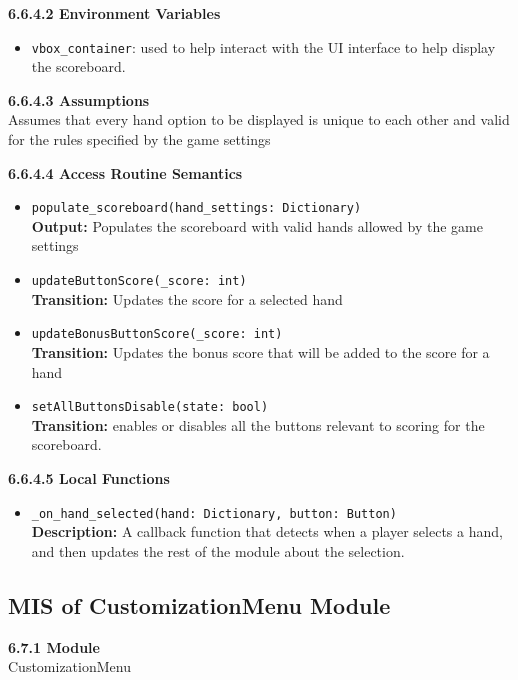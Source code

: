 \documentclass[12pt, titlepage]{article}
\begin{document}
\textbf{6.6.4.2 Environment Variables}

\begin{itemize}
	\item \texttt{vbox\_container}: used to help interact with the UI interface to help display the scoreboard. 
\end{itemize}

\textbf{6.6.4.3 Assumptions}\\
Assumes that every hand option to be displayed is unique to each other and valid for the rules specified by the game settings

\textbf{6.6.4.4 Access Routine Semantics}
\begin{itemize}

	\item \texttt{populate\_scoreboard(hand\_settings: Dictionary)}\\
	\textbf{Output:} Populates the scoreboard with valid hands allowed by the game settings
	
	
	\item \texttt{updateButtonScore(\_score: int)}\\
	\textbf{Transition:} Updates the score for a selected hand
	
	
	\item \texttt{updateBonusButtonScore(\_score: int)}\\
	\textbf{Transition:} Updates the bonus score that will be added to the score for a hand
	
	
	\item \texttt{setAllButtonsDisable(state: bool)}\\
	\textbf{Transition:} enables or disables all the buttons relevant to scoring for the scoreboard.
	
	


\end{itemize}

\textbf{6.6.4.5 Local Functions}

\begin{itemize}
    \item \texttt{\_on\_hand\_selected(hand: Dictionary, button: Button)}\\
    \textbf{Description:} A callback function that detects when a player selects a hand, and then updates the rest of the module about the selection.

\end{itemize}


\subsection{MIS of CustomizationMenu Module}\label{CustomizationMenu}
\textbf{6.7.1 Module}\\
 CustomizationMenu\\
\end{document}
